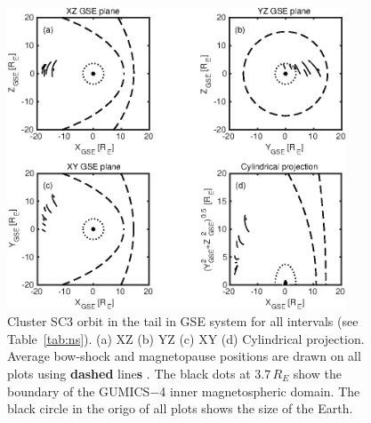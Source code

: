 \documentclass[linenumbers,draft]{agujournal}
\begin{document}
\begin{figure}[h]
\centering
\includegraphics[width=0.9\textwidth,angle=0]{swe-2021-corr-f12}  
\caption{Cluster SC3 orbit in the tail in GSE system for all intervals (see Table~\ref{tab:ns}). (a) XZ (b) YZ (c) XY (d) Cylindrical projection. Average bow-shock and magnetopause positions are drawn on all plots using \textbf{dashed} line\textbf{s} \citep[][respectively]{peredo95:_three_alfven_mach,tsyganenko95:_model_earth}. The black dots at $3.7\,R_E$ show the boundary of the GUMICS$-$4 inner magnetospheric domain. The black circle in the origo of all plots shows the size of the Earth.}
\label{fig:nsorbit}
\end{figure}



\pagebreak
\end{document}
